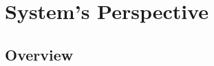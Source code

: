\section{System's Perspective}
\label{sec:systems_perspective}

\subsection{Overview}
\label{subsec:systems_perspective_overview}